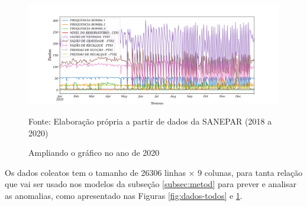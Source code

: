 \begin{figure}[H]
	\centering
	\caption{Ampliando o gráfico no ano de 2020}
	\label{fig:2020-a-frente}
	\includegraphics[width=1\linewidth]{"Introducao/Figuras/2020 a frente"}
	
	Fonte: Elaboração própria a partir de dados da SANEPAR (2018 a 2020)
\end{figure}

Os dados coleatos tem o tamanho de 26306 linhas × 9 colunas, para tanta relação que vai ser usado nos modelos da subseção \ref{subsec:metod} para prever e analisar as anomalias, como apresentado nas Figuras \ref{fig:dados-todos} e \ref{fig:2020-a-frente}.




